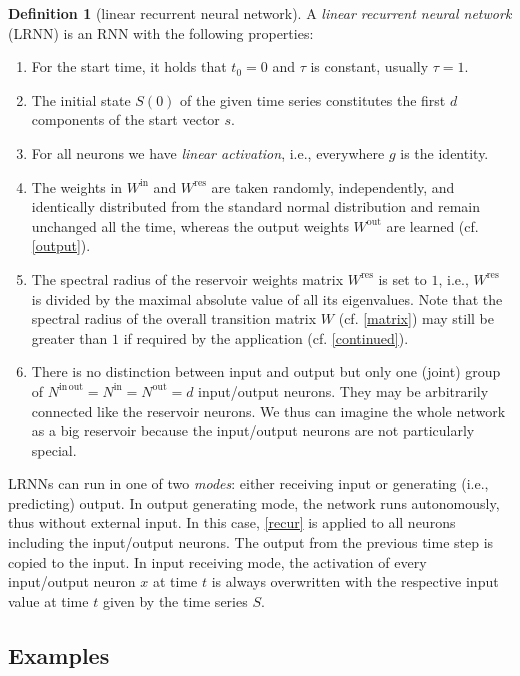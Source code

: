 \documentclass{sn-jnl}
\theoremstyle{definition}
\newtheorem{defn}{Definition}
\begin{document}
\begin{defn}[linear recurrent neural network]\label{thedef}
A \emph{linear recurrent neural network} (LRNN) is an RNN with the
following properties:
\begin{enumerate}
  \item For the start time, it holds that $t_0=0$ and $\tau$ is constant, usually $\tau=1$.
  \item The initial state $S(0)$ of the given time series constitutes the first
	$d$ components of the start vector $s$.
  \item For all neurons we have \emph{linear activation}, i.e., everywhere $g$
	is the identity.
  \item The weights in $W^\mathrm{in}$ and $W^\mathrm{res}$ are taken
	randomly, independently, and identically distributed from the standard
	normal distribution and remain unchanged all the time,
	whereas the output weights $W^\mathrm{out}$ are learned (cf. \cref{output}).
  \item The spectral radius of the reservoir weights matrix $W^\mathrm{res}$ is
	set to $1$, i.e., $W^\mathrm{res}$ is divided by the maximal absolute
	value of all its eigenvalues. Note that the spectral radius of the
	overall transition matrix $W$ (cf. \cref{matrix}) may still be greater
	than $1$ if required by the application (cf. \cref{continued}).
  \item There is no distinction between input and output but only one (joint)
	group of $N^\mathrm{in\,out} = N^\mathrm{in}=N^\mathrm{out}=d$ input/output neurons. They may
	be arbitrarily connected like the reservoir neurons. We thus can imagine
	the whole network as a big reservoir because the input/output neurons
	are not particularly special.
\end{enumerate}
\end{defn}

LRNNs can run in one of two \emph{modes}: either receiving input or generating
(i.e., predicting) output. In output generating mode, the network runs
autonomously, thus without external input. In this case, \cref{recur} is applied
to all neurons including the input/output neurons. The output from the
previous time step is copied to the input. In input receiving mode, the
activation of every input/output neuron $x$ at time $t$ is always overwritten
with the respective input value at time $t$ given by the time series $S$.

\subsection{Examples}
\end{document}
